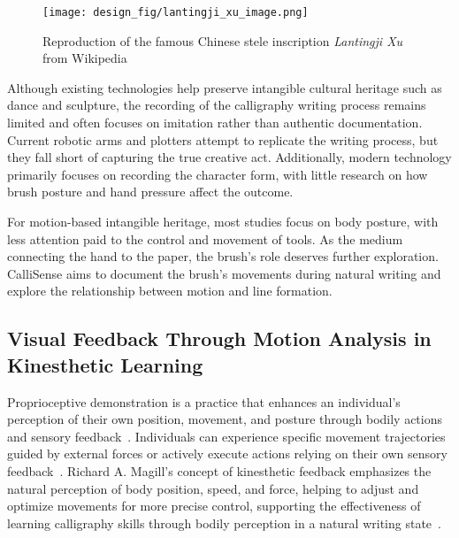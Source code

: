 \begin{figure}[t!]
  \centering
  \texttt{[image: design\_fig/lantingji\_xu\_image.png]}
  \caption{Reproduction of the famous Chinese stele inscription \textit{Lantingji Xu} from {Wikipedia}\protect\footnotemark}
  \label{fig:lantingji_xu}
\end{figure}







Although existing technologies help preserve intangible cultural heritage such as dance and sculpture, the recording of the calligraphy writing process remains limited and often focuses on imitation rather than authentic documentation. Current robotic arms and plotters attempt to replicate the writing process, but they fall short of capturing the true creative act. Additionally, modern technology primarily focuses on recording the character form, with little research on how brush posture and hand pressure affect the outcome.

For motion-based intangible heritage, most studies focus on body posture, with less attention paid to the control and movement of tools. As the medium connecting the hand to the paper, the brush's role deserves further exploration. CalliSense aims to document the brush's movements during natural writing and explore the relationship between motion and line formation.



\subsection{Visual Feedback Through Motion Analysis in Kinesthetic Learning}
Proprioceptive demonstration is a practice that enhances an individual's perception of their own position, movement, and posture through bodily actions and sensory feedback~\cite{tuthill2018proprioception, 10.1080/00222895.1974.10734977, winter2022effectiveness}. Individuals can experience specific movement trajectories guided by external forces or actively execute actions relying on their own sensory feedback~\cite{wong2012can, FARRER2003609}. Richard A. Magill's concept of kinesthetic feedback emphasizes the natural perception of body position, speed, and force, helping to adjust and optimize movements for more precise control, supporting the effectiveness of learning calligraphy skills through bodily perception in a natural writing state~\cite{magill2010motor}. 

